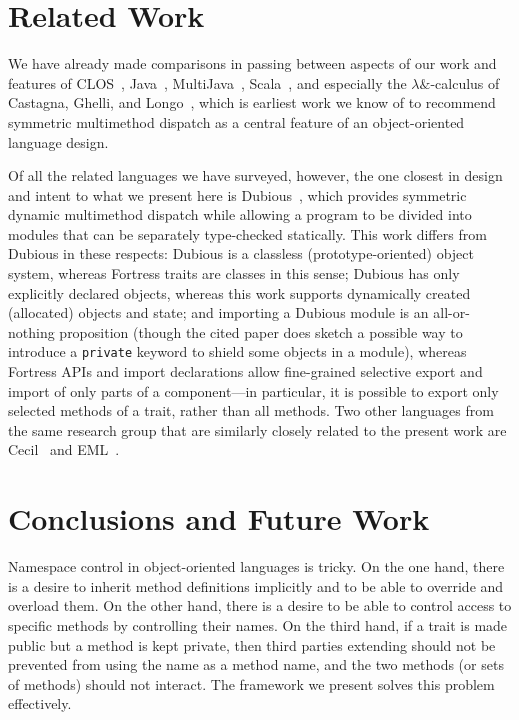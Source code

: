\section{Related Work}

We have already made comparisons in passing between aspects of our work
and features of CLOS~\cite{ECOOP87-CLOS,CLOS-SPECIFICATION,CLTL2,CACM-CLOS}, Java~\cite{JLS1},
MultiJava~\cite{MULTIJAVA-OOPSLA-2000,MULTIJAVA-TOPLAS-2006},
Scala~\cite{SCALA-ABSTRACTIONS},
and especially the
$\lambda\&$-calculus of Castagna, Ghelli, and Longo~\cite{LFP92-OVERLOADED-FUNCTIONS-WITH-SUBTYPING},
which is earliest work we know of to recommend symmetric multimethod dispatch
as a central feature of an object-oriented language design.

Of all the related languages we have surveyed, however, the one closest in design and intent to what
we present here is Dubious~\cite{MODULAR-STATICALLY-TYPED-MULTIMETHODS},
which provides symmetric dynamic multimethod dispatch while allowing
a program to be divided into modules that can be separately type-checked statically.
This work differs from Dubious in these respects: Dubious is a classless (prototype-oriented)
object system, whereas Fortress traits are classes in this sense;
Dubious has only explicitly declared objects, whereas this work supports dynamically
created (allocated) objects and state;
and importing a Dubious module is an all-or-nothing proposition (though the cited paper
does sketch a possible way to introduce a {\tt private} keyword to shield some objects
in a module),
whereas Fortress APIs and import declarations allow fine-grained selective export and import
of only parts of a component---in particular, it is possible to export only selected
methods of a trait, rather than all methods.
Two other languages from the same research group that are similarly closely related
to the present work are Cecil~\cite{CECIL-MULTIMETHODS,CECIL-REPORT-1993,CECIL-REPORT-2004}
and EML~\cite{TOPLAS-EML-MODULAR-TYPECHECKING}.


\section{Conclusions and Future Work}

Namespace control in object-oriented languages is tricky.  On the one hand,
there is a desire to inherit method definitions implicitly and to
be able to override and overload them.  On the other hand, there is a desire
to be able to control access to specific methods by controlling their names.
On the third hand, if a trait  is made public but a method  is kept private,
then third parties extending  should not be prevented from using the name
 as a method name, and the two methods (or sets of methods) should not interact.
The framework we present solves this problem effectively.


